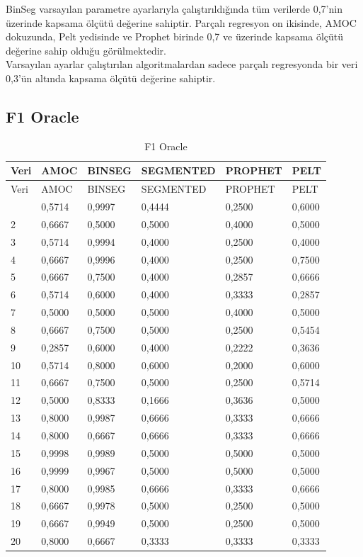 \documentclass[12pt,twoside]{deuthesis}
\begin{document}
BinSeg varsayılan parametre ayarlarıyla çalıştırıldığında tüm verilerde 0,7'nin üzerinde kapsama ölçütü değerine sahiptir. Parçalı regresyon on ikisinde, AMOC dokuzunda, Pelt yedisinde ve Prophet birinde 0,7 ve üzerinde kapsama ölçütü değerine sahip olduğu görülmektedir.\\
Varsayılan ayarlar çalıştırılan algoritmalardan sadece parçalı regresyonda bir veri 0,3'ün altında kapsama ölçütü değerine sahiptir.

\hypertarget{f1-oracle-1}{%
\subsection{F1 Oracle}\label{f1-oracle-1}}

\begin{longtable}[]{@{}llllll@{}}
\caption{\label{tab:nvar9} F1 Oracle}\tabularnewline
\toprule\noalign{}
Veri & AMOC & BINSEG & SEGMENTED & PROPHET & PELT \\
\midrule\noalign{}
\endfirsthead
\toprule\noalign{}
Veri & AMOC & BINSEG & SEGMENTED & PROPHET & PELT \\
\midrule\noalign{}
\endhead
\bottomrule\noalign{}
\endlastfoot
1 & 0,5714 & 0,9997 & 0,4444 & 0,2500 & 0,6000 \\
2 & 0,6667 & 0,5000 & 0,5000 & 0,4000 & 0,5000 \\
3 & 0,5714 & 0,9994 & 0,4000 & 0,2500 & 0,4000 \\
4 & 0,6667 & 0,9996 & 0,4000 & 0,2500 & 0,7500 \\
5 & 0,6667 & 0,7500 & 0,4000 & 0,2857 & 0,6666 \\
6 & 0,5714 & 0,6000 & 0,4000 & 0,3333 & 0,2857 \\
7 & 0,5000 & 0,5000 & 0,5000 & 0,4000 & 0,5000 \\
8 & 0,6667 & 0,7500 & 0,5000 & 0,2500 & 0,5454 \\
9 & 0,2857 & 0,6000 & 0,4000 & 0,2222 & 0,3636 \\
10 & 0,5714 & 0,8000 & 0,6000 & 0,2000 & 0,6000 \\
11 & 0,6667 & 0,7500 & 0,5000 & 0,2500 & 0,5714 \\
12 & 0,5000 & 0,8333 & 0,1666 & 0,3636 & 0,5000 \\
13 & 0,8000 & 0,9987 & 0,6666 & 0,3333 & 0,6666 \\
14 & 0,8000 & 0,6667 & 0,6666 & 0,3333 & 0,6666 \\
15 & 0,9998 & 0,9989 & 0,5000 & 0,5000 & 0,5000 \\
16 & 0,9999 & 0,9967 & 0,5000 & 0,5000 & 0,5000 \\
17 & 0,8000 & 0,9985 & 0,6666 & 0,3333 & 0,6666 \\
18 & 0,6667 & 0,9978 & 0,5000 & 0,2500 & 0,5000 \\
19 & 0,6667 & 0,9949 & 0,5000 & 0,2500 & 0,5000 \\
20 & 0,8000 & 0,6667 & 0,3333 & 0,3333 & 0,3333 \\
\end{longtable}
\end{document}
